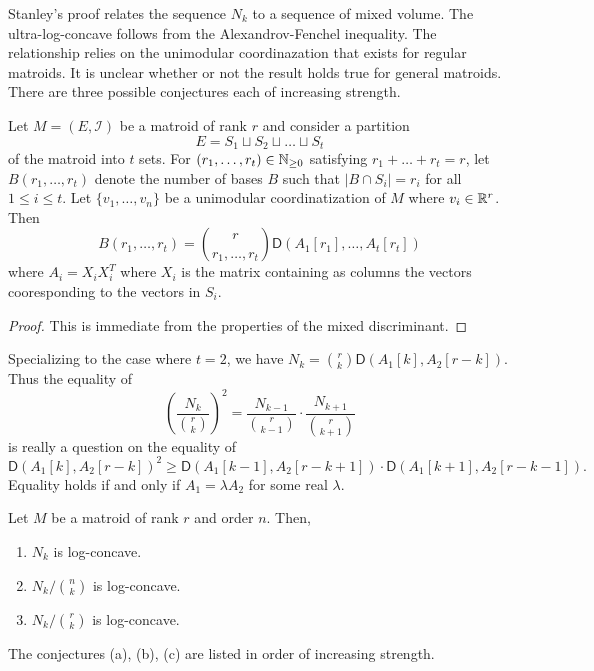 \documentclass[12pt]{article}
\begin{document}
Stanley's proof relates the sequence $N_k$ to a sequence of mixed volume. The ultra-log-concave follows from the Alexandrov-Fenchel inequality. The relationship relies on the unimodular coordinazation that exists for regular matroids. It is unclear whether or not the result holds true for general matroids. There are three possible conjectures each of increasing strength. 

\begin{thm}
	Let $M = (E, \mathcal{I})$ be a matroid of rank $r$ and consider a partition 
	\[
		E = S_1 \sqcup S_2 \sqcup \ldots \sqcup S_t
	\]
	of the matroid into $t$ sets. For $(r_1, \ldots, r_t) \in \mathbb{N}_{\geq 0}$ satisfying $r_1 + \ldots + r_t = r$, let $B(r_1, \ldots, r_t)$ denote the number of bases $B$ such that $|B \cap S_i| = r_i$ for all $1 \leq i \leq t$. Let $\{v_1, \ldots, v_n\}$ be a unimodular coordinatization of $M$ where $v_i \in \mathbb{R}^r$. Then 
	\[
		B(r_1, \ldots, r_t) = \binom{r}{r_1, \ldots, r_t} \mathsf{D} (A_1 [r_1], \ldots, A_t [r_t])
	\]
	where $A_i = X_i X_i^T$ where $X_i$ is the matrix containing as columns the vectors cooresponding to the vectors in $S_i$. 
\end{thm}

\begin{proof}
	This is immediate from the properties of the mixed discriminant. 
\end{proof}

Specializing to the case where $t = 2$, we have $N_k = \binom{r}{k} \mathsf{D} (A_1[k], A_2[r-k])$. Thus the equality of 
\[
	\left ( \frac{N_k}{\binom{r}{k}} \right )^2 = \frac{N_{k-1}}{\binom{r}{k-1}} \cdot \frac{N_{k+1}}{\binom{r}{k+1}}
\]
is really a question on the equality of 
\[
	\mathsf{D}(A_1[k], A_2[r-k])^2 \geq \mathsf{D}(A_1[k-1], A_2[r-k+1]) \cdot \mathsf{D}(A_1[k+1], A_2[r-k-1]). 
\]
Equality holds if and only if $A_1 = \lambda A_2$ for some real $\lambda$. 


\begin{conj} \label{main-conjecture}
	Let $M$ be a matroid of rank $r$ and order $n$. Then,  
	\begin{enumerate}[label = (\alph*)]
		\item $N_k$ is log-concave.
		\item $N_k /\binom{n}{k}$ is log-concave.
		\item $N_k / \binom{r}{k}$ is log-concave.
	\end{enumerate}
\end{conj}

The conjectures (a), (b), (c) are listed in order of increasing strength. 
\end{document}
